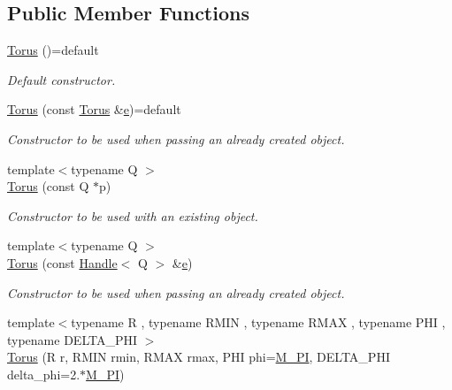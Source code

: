 \subsection*{Public Member Functions}
\begin{DoxyCompactItemize}
\item 
\hyperlink{class_d_d4hep_1_1_geometry_1_1_torus_a11dd17c49ab39945dd80dccaa9cbbd2a}{Torus} ()=default
\begin{DoxyCompactList}\small\item\em Default constructor. \end{DoxyCompactList}\item 
\hyperlink{class_d_d4hep_1_1_geometry_1_1_torus_a8c22c483791b6ad515befdbbbc8fbbfe}{Torus} (const \hyperlink{class_d_d4hep_1_1_geometry_1_1_torus}{Torus} \&\hyperlink{_volumes_8cpp_a8a9a1f93e9b09afccaec215310e64142}{e})=default
\begin{DoxyCompactList}\small\item\em Constructor to be used when passing an already created object. \end{DoxyCompactList}\item 
{\footnotesize template$<$typename Q $>$ }\\\hyperlink{class_d_d4hep_1_1_geometry_1_1_torus_afc607aed036a03378c0d1d97cc1b5ae7}{Torus} (const Q $\ast$p)
\begin{DoxyCompactList}\small\item\em Constructor to be used with an existing object. \end{DoxyCompactList}\item 
{\footnotesize template$<$typename Q $>$ }\\\hyperlink{class_d_d4hep_1_1_geometry_1_1_torus_a3916dafec28122360c4b68fa9a1c0444}{Torus} (const \hyperlink{class_d_d4hep_1_1_handle}{Handle}$<$ Q $>$ \&\hyperlink{_volumes_8cpp_a8a9a1f93e9b09afccaec215310e64142}{e})
\begin{DoxyCompactList}\small\item\em Constructor to be used when passing an already created object. \end{DoxyCompactList}\item 
{\footnotesize template$<$typename R , typename R\+M\+IN , typename R\+M\+AX , typename P\+HI , typename D\+E\+L\+T\+A\+\_\+\+P\+HI $>$ }\\\hyperlink{class_d_d4hep_1_1_geometry_1_1_torus_af3a069be4809e8fa80b8f5b5f6c4761f}{Torus} (R r, R\+M\+IN rmin, R\+M\+AX rmax, P\+HI phi=\hyperlink{_x_m_l_elements_8h_ae71449b1cc6e6250b91f539153a7a0d3}{M\+\_\+\+PI}, D\+E\+L\+T\+A\+\_\+\+P\+HI delta\+\_\+phi=2.$\ast$\hyperlink{_x_m_l_elements_8h_ae71449b1cc6e6250b91f539153a7a0d3}{M\+\_\+\+PI})

\end{DoxyCompactItemize}
